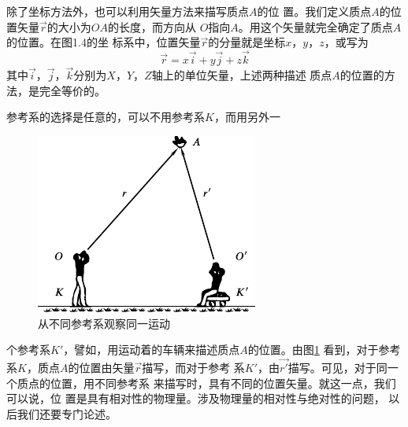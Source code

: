 除了坐标方法外，也可以利用矢量方法来描写质点$A$的位
置。我们定义质点$A$的位置矢量$\vec{r}$的大小为$OA$的长度，而方向从
$O$指向$A$。用这个矢量就完全确定了质点$A$的位置。在图1.4的坐
标系中，位置矢量$\vec{r}$的分量就是坐标$x$，$y$，$z$，或写为
\begin{equation}\label{eqn:01.04.01}
  \vec{r}=x\vec{i}+y\vec{j}+z\vec{k}
\end{equation}
其中$\vec{i}$，$\vec{j}$，$\vec{k}$分别为$X$，$Y$，$Z$轴上的单位矢量，上述两种描述
质点$A$的位置的方法，是完全等价的。

参考系的选择是任意的，可以不用参考系$K$，而用另外一
\begin{figure}
  \includegraphics{figure/fig01.05}
  \caption{从不同参考系观察同一运动}
  \label{fig:01.05}
\end{figure}
个参考系$K'$，譬如，用运动着的车辆来描述质点$A$的位置。由图\ref{fig:01.05}
看到，对于参考系$K$，质点$A$的位置由矢量$\vec{r}$描写，而对于参考
系$K'$，由$\vec{r'}$描写。可见，对于同一个质点的位置，用不同参考系
来描写时，具有不同的位置矢量。就这一点，我们可以说，位
置是具有相对性的物理量。涉及物理量的相对性与绝对性的问题，
以后我们还要专门论述。
